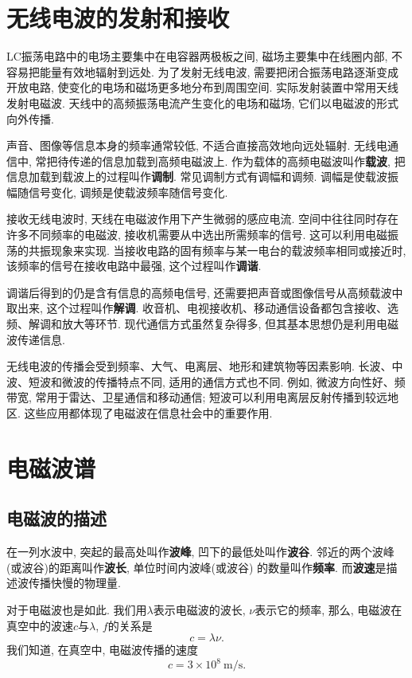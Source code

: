 \documentclass[11pt,a4paper]{ctexbook}
\newcommand{\unit}[1]{\ \mathrm{#1}}
\begin{document}
\section{无线电波的发射和接收}

LC振荡电路中的电场主要集中在电容器两极板之间, 磁场主要集中在线圈内部, 不容易把能量有效地辐射到远处.
为了发射无线电波, 需要把闭合振荡电路逐渐变成开放电路, 使变化的电场和磁场更多地分布到周围空间.
实际发射装置中常用天线发射电磁波. 天线中的高频振荡电流产生变化的电场和磁场,
它们以电磁波的形式向外传播.

声音、图像等信息本身的频率通常较低, 不适合直接高效地向远处辐射. 无线电通信中,
常把待传递的信息加载到高频电磁波上. 作为载体的高频电磁波叫作\textbf{载波},
把信息加载到载波上的过程叫作\textbf{调制}. 常见调制方式有调幅和调频. 调幅是使载波振幅随信号变化,
调频是使载波频率随信号变化.

接收无线电波时, 天线在电磁波作用下产生微弱的感应电流. 空间中往往同时存在许多不同频率的电磁波,
接收机需要从中选出所需频率的信号. 这可以利用电磁振荡的共振现象来实现. 当接收电路的固有频率与某一电台的载波频率相同或接近时,
该频率的信号在接收电路中最强, 这个过程叫作\textbf{调谐}.

调谐后得到的仍是含有信息的高频电信号, 还需要把声音或图像信号从高频载波中取出来,
这个过程叫作\textbf{解调}. 收音机、电视接收机、移动通信设备都包含接收、选频、解调和放大等环节.
现代通信方式虽然复杂得多, 但其基本思想仍是利用电磁波传递信息.

无线电波的传播会受到频率、大气、电离层、地形和建筑物等因素影响. 长波、中波、短波和微波的传播特点不同,
适用的通信方式也不同. 例如, 微波方向性好、频带宽, 常用于雷达、卫星通信和移动通信;
短波可以利用电离层反射传播到较远地区. 这些应用都体现了电磁波在信息社会中的重要作用.

\section{电磁波谱}
\label{电磁波谱}

\subsection{电磁波的描述}


在一列水波中, 突起的最高处叫作\textbf{波峰}, 凹下的最低处叫作\textbf{波谷}.
邻近的两个波峰(或波谷)的距离叫作\textbf{波长}, 单位时间内波峰(或波谷)
的数量叫作\textbf{频率}. 而\textbf{波速}是描述波传播快慢的物理量.

对于电磁波也是如此. 我们用$\lambda$表示电磁波的波长,
$\nu$表示它的频率, 那么, 电磁波在真空中的波速$c$与$\lambda$, $f$的关系是
$$c = \lambda \nu.$$
我们知道, 在真空中, 电磁波传播的速度$$c = 3\times 10^8\unit{m/s}.$$
\end{document}
